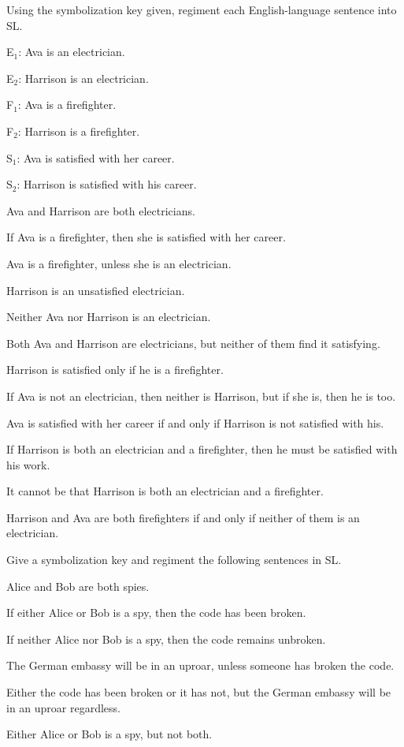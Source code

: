 \solutions
\problempart Using the symbolization key given, regiment each English-language sentence into SL.
\label{pr.avacareer}
\begin{ekey}
\item[E$_1$:] Ava is an electrician.
\item[E$_2$:] Harrison is an electrician.
\item[F$_1$:] Ava is a firefighter.
\item[F$_2$:] Harrison is a firefighter.
\item[S$_1$:] Ava is satisfied with her career.
\item[S$_2$:] Harrison is satisfied with his career.
\end{ekey}
\begin{earg}
\item Ava and Harrison are both electricians.
\item If Ava is a firefighter, then she is satisfied with her career.
\item Ava is a firefighter, unless she is an electrician.
\item Harrison is an unsatisfied electrician.
\item Neither Ava nor Harrison is an electrician.
\item Both Ava and Harrison are electricians, but neither of them find it satisfying.
\item Harrison is satisfied only if he is a firefighter.
\item If Ava is not an electrician, then neither is Harrison, but if she is, then he is too.
\item Ava is satisfied with her career if and only if Harrison is not satisfied with his.
\item If Harrison is both an electrician and a firefighter, then he must be satisfied with his work.
\item It cannot be that Harrison is both an electrician and a firefighter.
\item Harrison and Ava are both firefighters if and only if neither of them is an electrician.
\end{earg}




\solutions
\problempart
\label{pr.spies}
Give a symbolization key and regiment the following sentences in SL.
\begin{earg}
\item Alice and Bob are both spies.
\item If either Alice or Bob is a spy, then the code has been broken.
\item If neither Alice nor Bob is a spy, then the code remains unbroken.
\item The German embassy will be in an uproar, unless someone has broken the code.
\item Either the code has been broken or it has not, but the German embassy will be in an uproar regardless.
\item Either Alice or Bob is a spy, but not both.
\end{earg}

